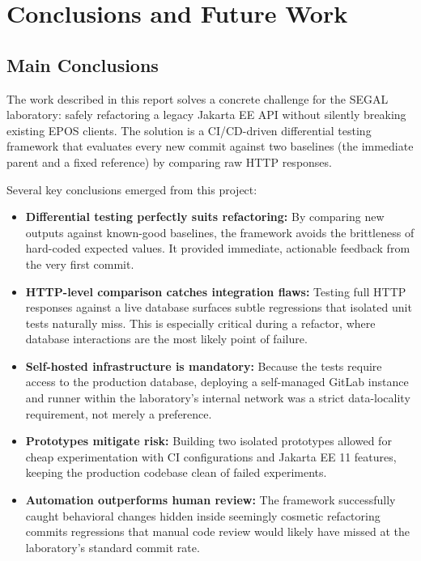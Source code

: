 \chapter{Conclusions and Future Work}
\label{chap:conc-trab-futuro}

\section{Main Conclusions}
\label{sec:conc-princ}

The work described in this report solves a concrete challenge for the \ac{SEGAL}
laboratory: safely refactoring a legacy Jakarta EE \ac{API} without
silently breaking existing \ac{EPOS} clients. The solution is a \ac{CI}/\ac{CD}-driven
differential testing framework that evaluates every new commit against two
baselines (the immediate parent and a fixed reference) by comparing raw \ac{HTTP}
responses.

Several key conclusions emerged from this project:
\begin{itemize}
	\item \textbf{Differential testing perfectly suits refactoring:} By
		comparing new outputs against known-good baselines, the framework avoids
		the brittleness of hard-coded expected values. It provided immediate, actionable
		feedback from the very first commit.

	\item \textbf{\ac{HTTP}-level comparison catches integration flaws:}
		Testing full \ac{HTTP} responses against a live database surfaces subtle
		regressions that isolated unit tests naturally miss. This is especially
		critical during a refactor, where database interactions are the most likely
		point of failure.

	\item \textbf{Self-hosted infrastructure is mandatory:} Because the tests
		require access to the production database, deploying a self-managed GitLab
		instance and runner within the laboratory's internal network was a strict
		data-locality requirement, not merely a preference.

	\item \textbf{Prototypes mitigate risk:} Building two isolated prototypes
		allowed for cheap experimentation with \ac{CI} configurations and Jakarta
		EE 11 features, keeping the production codebase clean of failed
		experiments.

	\item \textbf{Automation outperforms human review:} The framework
		successfully caught behavioral changes hidden inside seemingly cosmetic
		refactoring commits regressions that manual code review would likely
		have missed at the laboratory's standard commit rate.
\end{itemize}

